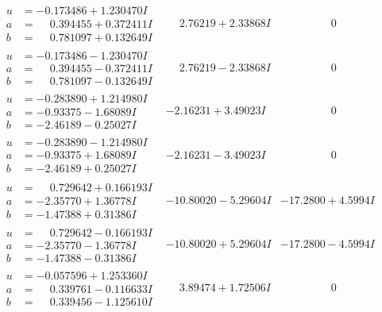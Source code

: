 \documentclass[1p]{elsarticle_modified}
\theoremstyle{definition}
\begin{document}
$$\begin{array}{c|c|c}
\begin{aligned}
u &= -0.173486 + 1.230470 I \\
a &= \phantom{-}0.394455 + 0.372411 I \\
b &= \phantom{-}0.781097 + 0.132649 I\end{aligned}
 & \phantom{-}2.76219 + 2.33868 I & \phantom{-0.000000 } 0 \\ \hline\begin{aligned}
u &= -0.173486 - 1.230470 I \\
a &= \phantom{-}0.394455 - 0.372411 I \\
b &= \phantom{-}0.781097 - 0.132649 I\end{aligned}
 & \phantom{-}2.76219 - 2.33868 I & \phantom{-0.000000 } 0 \\ \hline\begin{aligned}
u &= -0.283890 + 1.214980 I \\
a &= -0.93375 - 1.68089 I \\
b &= -2.46189 - 0.25027 I\end{aligned}
 & -2.16231 + 3.49023 I & \phantom{-0.000000 } 0 \\ \hline\begin{aligned}
u &= -0.283890 - 1.214980 I \\
a &= -0.93375 + 1.68089 I \\
b &= -2.46189 + 0.25027 I\end{aligned}
 & -2.16231 - 3.49023 I & \phantom{-0.000000 } 0 \\ \hline\begin{aligned}
u &= \phantom{-}0.729642 + 0.166193 I \\
a &= -2.35770 + 1.36778 I \\
b &= -1.47388 + 0.31386 I\end{aligned}
 & -10.80020 - 5.29604 I & -17.2800 + 4.5994 I \\ \hline\begin{aligned}
u &= \phantom{-}0.729642 - 0.166193 I \\
a &= -2.35770 - 1.36778 I \\
b &= -1.47388 - 0.31386 I\end{aligned}
 & -10.80020 + 5.29604 I & -17.2800 - 4.5994 I \\ \hline\begin{aligned}
u &= -0.057596 + 1.253360 I \\
a &= \phantom{-}0.339761 - 0.116633 I \\
b &= \phantom{-}0.339456 - 1.125610 I\end{aligned}
 & \phantom{-}3.89474 + 1.72506 I & \phantom{-0.000000 } 0 \\ \hline\begin{aligned}

\end{aligned}
\end{array}$$
\end{document}

